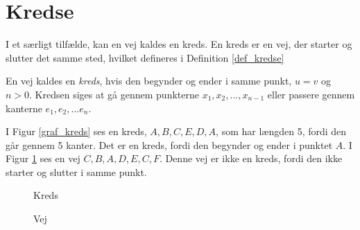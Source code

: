 \section{Kredse}
I et særligt tilfælde, kan en vej kaldes en kreds.
En kreds er en vej, der starter og slutter det samme sted, hvilket defineres i Definition \ref{def_kredse}

\begin{defn}
\label{def_kredse}
En vej kaldes en \textit{kreds}, hvis den begynder og ender i samme punkt, $u=v$ og $n>0$.
Kredsen siges at gå gennem punkterne $x_1,x_2,...,x_{n-1}$ eller passere gennem kanterne $e_1, e_2,...e_n$.
\end{defn}

\begin{exmp}
I Figur \ref{graf_kreds} ses en kreds, $A,B,C,E,D,A$, som har længden 5, fordi den går gennem 5 kanter. Det er en kreds, fordi den begynder og ender i punktet $A$.
I Figur \ref{graf_ikke_kreds} ses en vej $C,B,A,D,E,C,F$.
Denne vej er ikke en kreds, fordi den ikke starter og slutter i samme punkt. 
\end{exmp}

\begin{figure}[!htb]
   \begin{minipage}{0.48\textwidth}
     \centering
     \caption{Kreds}
     \label{graf_kreds}
   \end{minipage}\hfill
   \begin{minipage}{0.48\textwidth}
     \centering
     \caption{Vej}
     \label{graf_ikke_kreds}
   \end{minipage}
\end{figure}

